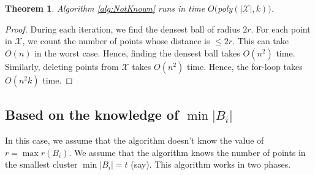 \documentclass[twoside]{article}
\newtheorem{theorem}{Theorem}
\begin{document}
\begin{theorem}
Algorithm \ref{alg:NotKnown} runs in time $O($poly$(|\mathcal{X}|,k))$.
\end{theorem}
\begin{proof}
During each iteration, we find the densest ball of radius $2r$. For each point in $\mathcal{X}$, we count the number of points whose distance is $\le 2r$. This can take $O(n)$ in the worst case. Hence, finding the densest ball takes $O(n^2)$ time. Similarly, deleting points from $\mathcal{X}$ takes $O(n^2)$ time. Hence, the for-loop takes $O(n^2k)$ time.
\end{proof}

\subsection{Based on the knowledge of $\min |B_i|$}
In this case, we assume that the algorithm doesn't know the value of $r = \max r(B_i)$. We assume that the algorithm knows the number of points in the smallest cluster $\min |B_i| = t$ (say). This algorithm works in two phases.
\end{document}
